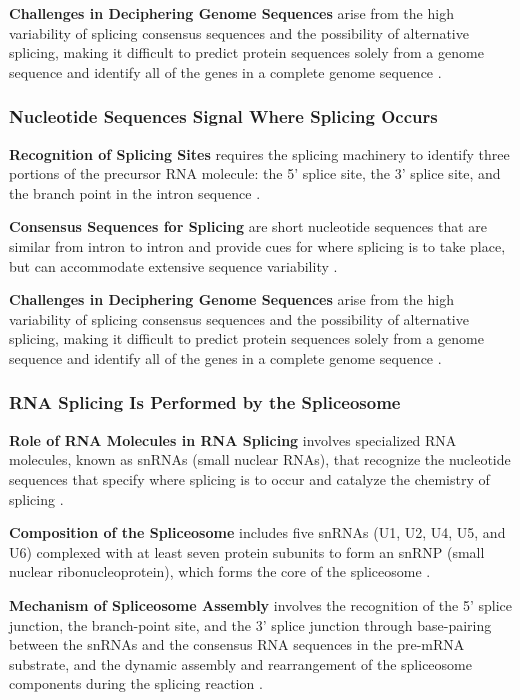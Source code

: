 \textbf{Challenges in Deciphering Genome Sequences} arise from the high variability of splicing consensus sequences and the possibility of alternative splicing, making it difficult to predict protein sequences solely from a genome sequence and identify all of the genes in a complete genome sequence \cite*{L1-Chapter6}.

\subsubsection*{Nucleotide Sequences Signal Where Splicing Occurs}
\textbf{Recognition of Splicing Sites} requires the splicing machinery to identify three portions of the precursor RNA molecule: the 5' splice site, the 3' splice site, and the branch point in the intron sequence \cite*{L1-Chapter6}.

\textbf{Consensus Sequences for Splicing} are short nucleotide sequences that are similar from intron to intron and provide cues for where splicing is to take place, but can accommodate extensive sequence variability \cite*{L1-Chapter6}.

\textbf{Challenges in Deciphering Genome Sequences} arise from the high variability of splicing consensus sequences and the possibility of alternative splicing, making it difficult to predict protein sequences solely from a genome sequence and identify all of the genes in a complete genome sequence \cite*{L1-Chapter6}.

\subsubsection*{RNA Splicing Is Performed by the Spliceosome}
\textbf{Role of RNA Molecules in RNA Splicing} involves specialized RNA molecules, known as snRNAs (small nuclear RNAs), that recognize the nucleotide sequences that specify where splicing is to occur and catalyze the chemistry of splicing \cite*{L1-Chapter6}.

\textbf{Composition of the Spliceosome} includes five snRNAs (U1, U2, U4, U5, and U6) complexed with at least seven protein subunits to form an snRNP (small nuclear ribonucleoprotein), which forms the core of the spliceosome \cite*{L1-Chapter6}.

\textbf{Mechanism of Spliceosome Assembly} involves the recognition of the 5' splice junction, the branch-point site, and the 3' splice junction through base-pairing between the snRNAs and the consensus RNA sequences in the pre-mRNA substrate, and the dynamic assembly and rearrangement of the spliceosome components during the splicing reaction \cite*{L1-Chapter6}.

